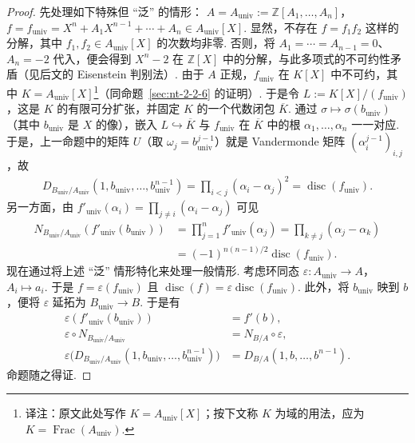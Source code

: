 \begin{proof}
先处理如下特殊但 ``泛'' 的情形：
$A=A_{\mathrm{univ}}:=\mathbb Z[A_1,\ldots,A_n]$，
$f=f_{\mathrm{univ}}=X^n+A_1X^{n-1}+\cdots+A_n\in A_{\mathrm{univ}}[X]$.
显然，不存在 $f=f_1f_2$ 这样的分解，其中 $f_1,f_2\in A_{\mathrm{univ}}[X]$ 的次数均非零. 否则，将 $A_1=\cdots=A_{n-1}=0$、$A_n=-2$ 代入，便会得到 $X^n-2$ 在 $\mathbb Z[X]$ 中的分解，与此多项式的不可约性矛盾（见后文的 Eisenstein 判别法）.
由于 $A$ 正规，$f_{\mathrm{univ}}$ 在 $K[X]$ 中不可约，其中 $K=A_{\mathrm{univ}}[X]$\footnote{译注：原文此处写作 $K=A_{\mathrm{univ}}[X]$；按下文称 $K$ 为域的用法，应为 $K=\operatorname{Frac}(A_{\mathrm{univ}})$.}（同命题~\ref{sec:nt-2-2-6} 的证明）.
于是令 $L:=K[X]/(f_{\mathrm{univ}})$，这是 $K$ 的有限可分扩张，并固定 $K$ 的一个代数闭包 $\overline K$.
通过 $\sigma\mapsto\sigma(b_{\mathrm{univ}})$（其中 $b_{\mathrm{univ}}$ 是 $X$ 的像），嵌入 $L\hookrightarrow\overline K$ 与 $f_{\mathrm{univ}}$ 在 $\overline K$ 中的根 $\alpha_1,\ldots,\alpha_n$ 一一对应.
于是，上一命题中的矩阵 $U$（取 $\omega_j=b_{\mathrm{univ}}^{j-1}$）就是 Vandermonde 矩阵 $(\alpha_i^{j-1})_{i,j}$，故
\begin{align*}
D_{B_{\mathrm{univ}}/A_{\mathrm{univ}}}(1,b_{\mathrm{univ}},\ldots,b_{\mathrm{univ}}^{n-1})
=\prod_{i<j}(\alpha_i-\alpha_j)^2
=\operatorname{disc}(f_{\mathrm{univ}}).
\end{align*}
另一方面，由 $f'_{\mathrm{univ}}(\alpha_i)=\prod_{j\ne i}(\alpha_i-\alpha_j)$ 可见
\begin{align*}
N_{B_{\mathrm{univ}}/A_{\mathrm{univ}}}(f'_{\mathrm{univ}}(b_{\mathrm{univ}}))
&=\prod_{j=1}^nf'_{\mathrm{univ}}(\alpha_j)
=\prod_{k\ne j}(\alpha_j-\alpha_k)\\
&=(-1)^{n(n-1)/2}\operatorname{disc}(f_{\mathrm{univ}}).
\end{align*}
现在通过将上述 ``泛'' 情形特化来处理一般情形. 考虑环同态
$\varepsilon\colon A_{\mathrm{univ}}\longrightarrow A$，$A_i\mapsto a_i$.
于是 $f=\varepsilon(f_{\mathrm{univ}})$ 且
$\operatorname{disc}(f)=\varepsilon\operatorname{disc}(f_{\mathrm{univ}})$.
此外，将 $b_{\mathrm{univ}}$ 映到 $b$，便将 $\varepsilon$ 延拓为 $B_{\mathrm{univ}}\longrightarrow B$.
于是有
\begin{align*}
\varepsilon(f'_{\mathrm{univ}}(b_{\mathrm{univ}}))&=f'(b),\\
\varepsilon\circ N_{B_{\mathrm{univ}}/A_{\mathrm{univ}}}&=N_{B/A}\circ\varepsilon,\\
\varepsilon\bigl(D_{B_{\mathrm{univ}}/A_{\mathrm{univ}}}
(1,b_{\mathrm{univ}},\ldots,b_{\mathrm{univ}}^{n-1})\bigr)
&=D_{B/A}(1,b,\ldots,b^{n-1}).
\end{align*}
命题随之得证.
\end{proof}
